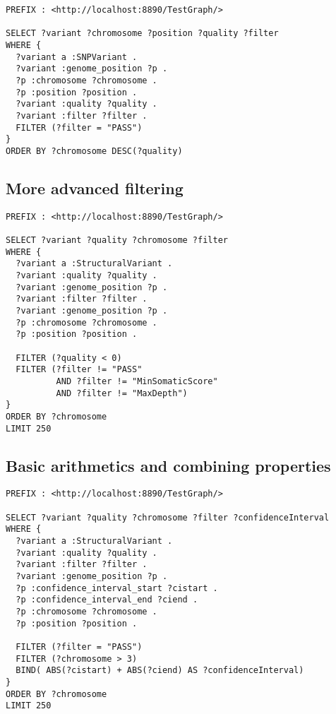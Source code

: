 \documentclass[11pt,a4paper,oneside]{book}
\begin{document}
\begin{siderules}
\begin{verbatim}
PREFIX : <http://localhost:8890/TestGraph/>

SELECT ?variant ?chromosome ?position ?quality ?filter
WHERE {
  ?variant a :SNPVariant .
  ?variant :genome_position ?p .
  ?p :chromosome ?chromosome .
  ?p :position ?position .
  ?variant :quality ?quality .
  ?variant :filter ?filter .
  FILTER (?filter = "PASS")
}
ORDER BY ?chromosome DESC(?quality)
\end{verbatim}
\end{siderules}

\subsection{More advanced filtering}

\begin{siderules}
\begin{verbatim}
PREFIX : <http://localhost:8890/TestGraph/>

SELECT ?variant ?quality ?chromosome ?filter
WHERE {
  ?variant a :StructuralVariant .
  ?variant :quality ?quality .
  ?variant :genome_position ?p .
  ?variant :filter ?filter .
  ?variant :genome_position ?p .
  ?p :chromosome ?chromosome .
  ?p :position ?position .

  FILTER (?quality < 0)
  FILTER (?filter != "PASS" 
          AND ?filter != "MinSomaticScore"
          AND ?filter != "MaxDepth")
}
ORDER BY ?chromosome
LIMIT 250
\end{verbatim}
\end{siderules}

\subsection{Basic arithmetics and combining properties}

\begin{siderules}
\begin{verbatim}
PREFIX : <http://localhost:8890/TestGraph/>

SELECT ?variant ?quality ?chromosome ?filter ?confidenceInterval
WHERE {
  ?variant a :StructuralVariant .
  ?variant :quality ?quality .
  ?variant :filter ?filter .
  ?variant :genome_position ?p .
  ?p :confidence_interval_start ?cistart .
  ?p :confidence_interval_end ?ciend .
  ?p :chromosome ?chromosome .
  ?p :position ?position .

  FILTER (?filter = "PASS")
  FILTER (?chromosome > 3)
  BIND( ABS(?cistart) + ABS(?ciend) AS ?confidenceInterval)
}
ORDER BY ?chromosome
LIMIT 250
\end{verbatim}
\end{siderules}
\end{document}
